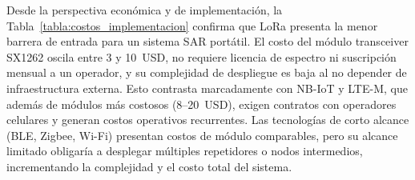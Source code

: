 Desde la perspectiva económica y de implementación, la Tabla~\ref{tabla:costos_implementacion} confirma que LoRa presenta la menor barrera de entrada para un sistema SAR portátil. El costo del módulo transceiver SX1262 oscila entre 3 y 10~USD, no requiere licencia de espectro ni suscripción mensual a un operador, y su complejidad de despliegue es baja al no depender de infraestructura externa. Esto contrasta marcadamente con NB-IoT y LTE-M, que además de módulos más costosos (8--20~USD), exigen contratos con operadores celulares y generan costos operativos recurrentes. Las tecnologías de corto alcance (BLE, Zigbee, Wi-Fi) presentan costos de módulo comparables, pero su alcance limitado obligaría a desplegar múltiples repetidores o nodos intermedios, incrementando la complejidad y el costo total del sistema.

\begin{table}[H]
\begin{center}
\caption{Comparación de costos y complejidad de implementación para un sistema SAR portátil.}
\label{tabla:costos_implementacion}
\end{center}
\end{table}


